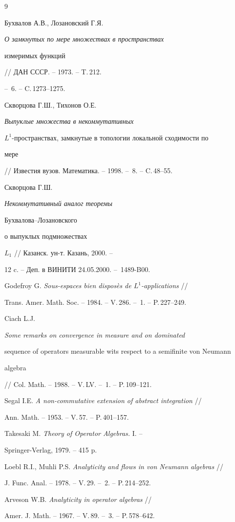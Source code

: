 \begin{thebibliography}{9}







Бухвалов А.В., Лозановский Г.Я.


{\it О замкнутых по мере множествах в пространствах


измеримых функций} // ДАН СССР. -- 1973. -- T.\,212.


-- \No\,6. -- C.\,1273--1275.




Скворцова Г.Ш., Тихонов О.Е. {\it Выпуклые множества в некоммутативных


$L^{1}$-прост\-ран\-ст\-вах, замкнутые в топологии локальной сходимости по


мере} // Известия вузов. Математика. -- 1998. -- \No\,8. -- C.\,48--55.




Скворцова Г.Ш. {\it Некоммутативный аналог теоремы


Бухвалова--Лозановского


о выпуклых подмножествах} $L_{1}$ // Казанск. ун-т. Казань, 2000. --


12 c. -- Деп. в ВИНИТИ 24.05.2000. -- \No\,1489-B00.




Godefroy G. {\it Sous-espaces bien dispos\`es de $L^{1}$-applications} //


Trans. Amer. Math. Soc. -- 1984. -- V.\,286. -- \No\,1. -- P.\,227--249.




Ciach L.J. {\it Some remarks on convergence in measure and on dominated


sequence of operators measurable wits respect to a semifinite von Neumann


algebra} // Col. Math. -- 1988. -- V.\,LV. -- \No\,1. -- P.\,109--121.




Segal I.E. {\it A non-commutative extension of abstract integration} //


Ann. Math. -- 1953. -- V.\,57. -- P.\,401--157.




Takesaki M. {\it Theory of Operator Algebras.} I. --


Springer-Verlag, 1979. -- 415 p.




Loebl R.I., Muhli P.S. {\it Analyticity and flows in von Neumann algebras} //


J. Func. Anal. -- 1978. -- V.\,29. -- \No\,2. -- P.\,214--252.




Arveson W.B. {\it Analyticity in operator algebras} //


Amer. J. Math. -- 1967. -- V.\,89. -- \No\,3. -- P.\,578--642.





\end{thebibliography}





